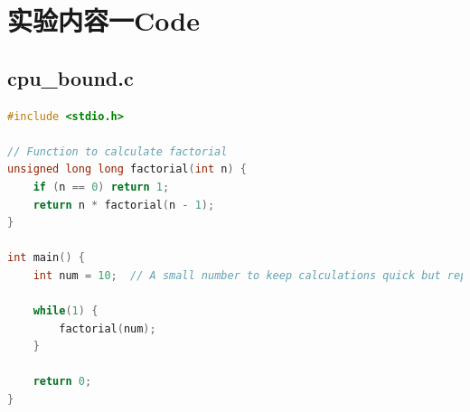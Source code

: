 \documentclass[12pt]{article}
\begin{document}
\newpage
\appendix
\section*{实验内容一Code}
\subsection*{cpu\_bound.c}
\begin{lstlisting}[language=C]
#include <stdio.h>

// Function to calculate factorial
unsigned long long factorial(int n) {
    if (n == 0) return 1;
    return n * factorial(n - 1);
}

int main() {
    int num = 10;  // A small number to keep calculations quick but repetitive

    while(1) {
        factorial(num);
    }

    return 0;
}

\end{lstlisting}
\end{document}
